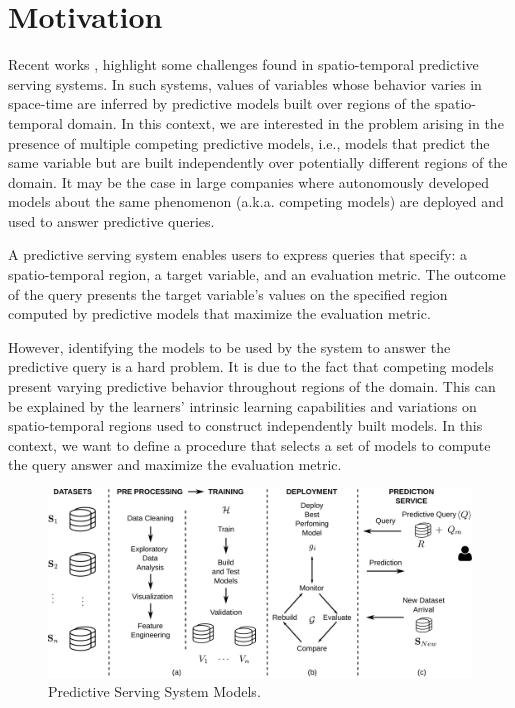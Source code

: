\section{Motivation}
\label{Sec:Motivation}

Recent works \cite{Ghanta022019, Crankshaw2017, Polyzotis2018}, highlight some challenges found in spatio-temporal predictive serving systems. In such systems, values of variables whose behavior varies in space-time are inferred by predictive models built over regions of the spatio-temporal domain. In this context, we are interested in the problem arising in the presence of multiple competing predictive models, i.e., models that predict the same variable but are built independently over potentially different regions of the domain. It may be the case in large companies where autonomously developed models about the same phenomenon (a.k.a. competing models) are deployed and used to answer predictive queries. 

A predictive serving system enables users to express queries that specify: a spatio-temporal region, a target variable, and an evaluation metric. The outcome of the query presents the target variable's values on the specified region computed by predictive models that maximize the evaluation metric. 

However, identifying the  models to be used by the system to answer the predictive query is a hard problem. It is due to the fact that competing models present varying predictive behavior throughout regions of the domain. This can be explained by the learners' intrinsic learning capabilities and variations on spatio-temporal regions used to construct independently built models. In this context, we want to define a procedure that selects a set of models to compute the query answer and maximize the evaluation metric. 

\begin{figure}[h]
	\centering
	\includegraphics[scale=0.31]{../Figures/ModelManagementPS-VersionCompleta}
	\caption{Predictive Serving System Models.}
	\label{Fig:MotiPoster}
\end{figure}

